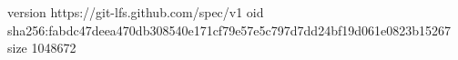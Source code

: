 version https://git-lfs.github.com/spec/v1
oid sha256:fabdc47deea470db308540e171cf79e57e5c797d7dd24bf19d061e0823b15267
size 1048672
